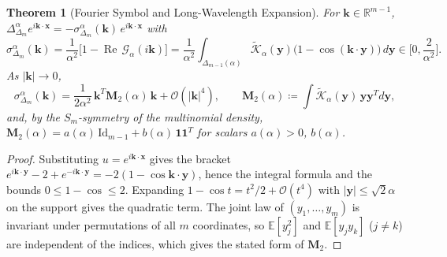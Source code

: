 \documentclass[11pt,a4paper]{article}
\theoremstyle{plain}
\newtheorem{theorem}{Theorem}[section]
\theoremstyle{definition}
\theoremstyle{remark}
\numberwithin{equation}{section}
\providecommand{\Id}{\mathrm{Id}}
\begin{document}
\begin{theorem}[Fourier Symbol and Long-Wavelength Expansion]
\label{thm:laplacian_symbol}
For $\mathbf{k} \in \mathbb{R}^{m-1}$, $\Delta_{\Delta_m}^\alpha e^{i\mathbf{k}\cdot\mathbf{x}} = -\sigma_{\Delta_m}^\alpha(\mathbf{k})\, e^{i\mathbf{k}\cdot\mathbf{x}}$ with
\begin{equation}
\sigma_{\Delta_m}^\alpha(\mathbf{k}) = \frac{1}{\alpha^2}\Big[1 - \operatorname{Re}\,\mathcal{G}_\alpha(i\mathbf{k})\Big] = \frac{1}{\alpha^2}\int_{\Delta_{m-1}(\alpha)} \widetilde{\mathcal{K}}_\alpha(\mathbf{y})\big(1 - \cos(\mathbf{k}\cdot\mathbf{y})\big)\,d\mathbf{y} \in \Big[0, \frac{2}{\alpha^2}\Big].
\end{equation}
As $|\mathbf{k}| \to 0$,
\begin{equation}
\sigma_{\Delta_m}^\alpha(\mathbf{k}) = \frac{1}{2\alpha^2}\,\mathbf{k}^T \mathbf{M}_2(\alpha)\,\mathbf{k} + \mathcal{O}(|\mathbf{k}|^4), \qquad \mathbf{M}_2(\alpha) \coloneqq \int \widetilde{\mathcal{K}}_\alpha(\mathbf{y})\, \mathbf{y}\mathbf{y}^T d\mathbf{y},
\end{equation}
and, by the $S_m$-symmetry of the multinomial density, $\mathbf{M}_2(\alpha) = a(\alpha)\,\Id_{m-1} + b(\alpha)\,\mathbf{1}\mathbf{1}^T$ for scalars $a(\alpha) > 0$, $b(\alpha)$.
\end{theorem}

\begin{proof}
Substituting $u = e^{i\mathbf{k}\cdot\mathbf{x}}$ gives the bracket $e^{i\mathbf{k}\cdot\mathbf{y}} - 2 + e^{-i\mathbf{k}\cdot\mathbf{y}} = -2(1 - \cos \mathbf{k}\cdot\mathbf{y})$, hence the integral formula and the bounds $0 \le 1 - \cos \le 2$. Expanding $1 - \cos t = t^2/2 + \mathcal{O}(t^4)$ with $|\mathbf{y}| \le \sqrt{2}\alpha$ on the support gives the quadratic term. The joint law of $(y_1,\dots,y_m)$ is invariant under permutations of all $m$ coordinates, so $\mathbb{E}[y_j^2]$ and $\mathbb{E}[y_jy_k]$ ($j \ne k$) are independent of the indices, which gives the stated form of $\mathbf{M}_2$.
\end{proof}
\end{document}
